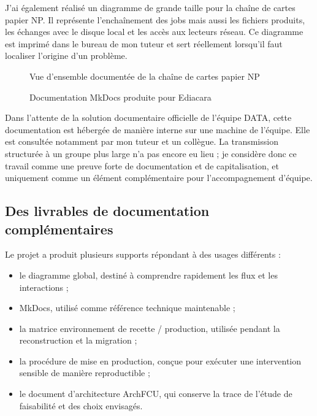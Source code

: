 J'ai également réalisé un diagramme de grande taille pour la chaîne de cartes papier NP. Il représente l'enchaînement des jobs mais aussi les fichiers produits, les échanges avec le disque local et les accès aux lecteurs réseau. Ce diagramme est imprimé dans le bureau de mon tuteur et sert réellement lorsqu'il faut localiser l'origine d'un problème.

\begin{figure}[H]
\centering
{}
\caption{Vue d'ensemble documentée de la chaîne de cartes papier NP}
\label{fig:diagramme-np-documentation}
\end{figure}

\begin{figure}[H]
\centering
{}
\caption{Documentation MkDocs produite pour Ediacara}
\label{fig:mkdocs-ediacara}
\end{figure}

Dans l'attente de la solution documentaire officielle de l'équipe DATA, cette documentation est hébergée de manière interne sur une machine de l'équipe. Elle est consultée notamment par mon tuteur et un collègue. La transmission structurée à un groupe plus large n'a pas encore eu lieu ; je considère donc ce travail comme une preuve forte de documentation et de capitalisation, et uniquement comme un élément complémentaire pour l'accompagnement d'équipe.

\subsection{Des livrables de documentation complémentaires}

Le projet a produit plusieurs supports répondant à des usages différents :

\begin{itemize}
    \item le diagramme global, destiné à comprendre rapidement les flux et les interactions ;
    \item MkDocs, utilisé comme référence technique maintenable ;
    \item la matrice environnement de recette / production, utilisée pendant la reconstruction et la migration ;
    \item la procédure de mise en production, conçue pour exécuter une intervention sensible de manière reproductible ;
    \item le document d'architecture ArchFCU, qui conserve la trace de l'étude de faisabilité et des choix envisagés.
\end{itemize}

